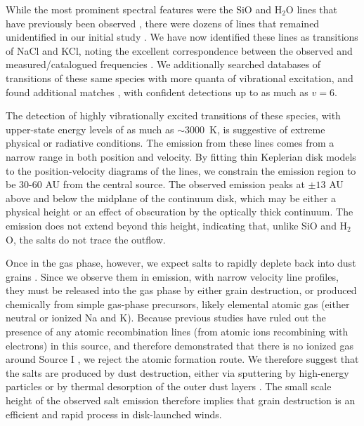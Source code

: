 \documentclass[12pt]{article}
\newcommand{\water}{H$_{2}$O\xspace}		%
\begin{document}
While the most prominent spectral features were the SiO and \water lines that
have previously been observed \cite{Goddi2013a,Hirota2014a}, there were dozens
of lines that remained unidentified in our initial study \cite{Ginsburg2018b}.
We have now identified these lines as transitions of NaCl and KCl, noting the
excellent correspondence between the observed and measured/catalogued
frequencies \cite{Caris2002a,Caris2004a,Muller2005a,Lovas2005b,Pickett1998a}.
We additionally searched databases of transitions of these same species with
more quanta of vibrational excitation, and found additional matches
\cite{Barton2014a,Cabezas2016a}, with confident detections up to as much as
$v=6$.


The detection of highly vibrationally excited transitions of these species,
with upper-state energy levels of as much as $\sim$3000~K, is suggestive of
extreme physical or radiative conditions.  The emission from these lines comes
from a narrow range in both position and velocity.  By fitting thin Keplerian
disk models to the position-velocity diagrams of the lines, we constrain the
emission region to be 30-60 AU from the central source.  The observed emission
peaks at $\pm13$ AU above and below the midplane of the continuum disk, which
may be either a physical height or an effect of obscuration by the optically
thick continuum.  The emission does not extend beyond this height, indicating
that, unlike SiO and \water, the salts do not trace the outflow.


Once in the gas phase, however, we expect salts to rapidly deplete back into
dust grains \cite{Cherchneff2012a}.  Since we observe them in emission, with
narrow velocity line profiles, they must be released into the gas phase by
either grain destruction, or produced chemically from simple gas-phase
precursors, likely elemental atomic gas (either neutral or ionized Na and K).
Because previous studies have ruled out the presence of any atomic
recombination lines (from atomic ions recombining with electrons) in this
source, and therefore demonstrated that there is no ionized gas around Source I
\cite{Plambeck2016a,Baez-Rubio2018a}, we reject the atomic formation route. We
therefore suggest that the salts are produced by dust destruction, either
via sputtering by high-energy particles \cite{Schilke1997a} or by thermal
desorption of the outer dust layers \cite{Decin2016a}.  The small scale
height of the observed salt emission therefore implies that grain destruction
is an efficient and rapid process in disk-launched winds.
\end{document}
